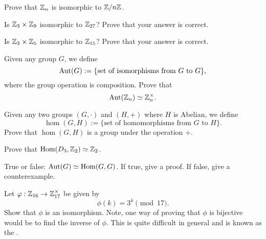 \documentclass{ximera}
\begin{document}
\begin{exercise}
  Prove that $\mathbb Z_n$ is isomorphic to $\mathbb Z/n\mathbb Z$.
\end{exercise}


\begin{exercise}
  Is $\mathbb Z_3\times \mathbb Z_9$ isomorphic to $\mathbb Z_{27}$? Prove that your answer
  is correct.
\end{exercise}

\begin{exercise}
  Is $\mathbb Z_3\times \mathbb Z_5$ isomorphic to $\mathbb Z_{15}$? Prove that your answer
  is correct.
\end{exercise}


\begin{exercise}
  Given any group $G$, we define
  \[
  \operatorname{Aut}(G) := \{\text{set of isomorphisms from $G$ to $G$}\},
  \]
  where the group operation is composition. Prove that
  \[
  \operatorname{Aut}(\mathbb Z_n) \simeq \mathbb Z_n^\times.
  \]
\end{exercise}


\begin{exercise}
  Given any two groups $(G,\cdot)$ and $(H,+)$ where $H$ is Abelian,
  we define
  \[
  \hom(G,H) := \{\text{set of homomorphisms from $G$ to $H$}\}.
  \]
  Prove that $\hom(G,H)$ is a group under the operation $+$.
\end{exercise}

\begin{exercise}
  Prove that $\operatorname{Hom}(D_3,\mathbb Z_2) \simeq \mathbb Z_2$.
\end{exercise}

\begin{exercise}
  True or false: $\operatorname{Aut}(G) \simeq \operatorname{Hom}(G,G)$. If true, give a proof. If
  false, give a counterexample.
\end{exercise}


\begin{exercise}
  Let $\varphi:\mathbb Z_{16}\to\mathbb Z_{17}^\times$ be given by
  \[
  \phi(k)= 3^k \pmod{17}.
  \]
  Show that $\phi$ is an isomorphism. Note, one way of proving that
  $\phi$ is bijective would be to find the inverse of $\phi$. This is
  quite difficult in general and is known as the .
\end{exercise}





\end{document}
